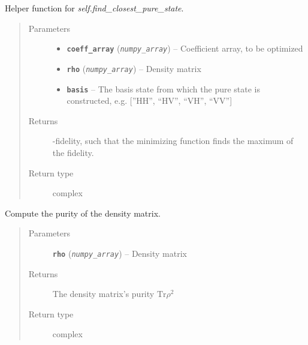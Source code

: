 \documentclass[letterpaper,10pt,english]{sphinxmanual}
\begin{document}
\begin{fulllineitems}
\begin{fulllineitems}
\label{modules:Tomography.DensityMatrix.opt_pure_state}
Helper function for \emph{self.find\_closest\_pure\_state}.
\begin{quote}\begin{description}
\item[{Parameters}] \leavevmode\begin{itemize}
\item {} 
\textbf{\texttt{coeff\_array}} (\emph{\texttt{numpy\_array}}) -- Coefficient array, to be optimized

\item {} 
\textbf{\texttt{rho}} (\emph{\texttt{numpy\_array}}) -- Density matrix

\item {} 
\textbf{\texttt{basis}} -- The basis state from which the pure state is constructed, e.g. {[}''HH'', ``HV'', ``VH'', ``VV''{]}

\end{itemize}

\item[{Returns}] -fidelity, such that the minimizing function finds the maximum of the fidelity.

\item[{Return type}] \leavevmode
complex

\end{description}\end{quote}

\end{fulllineitems}


\begin{fulllineitems}
\label{modules:Tomography.DensityMatrix.purity}
Compute the purity of the density matrix.
\begin{quote}\begin{description}
\item[{Parameters}] \leavevmode
\textbf{\texttt{rho}} (\emph{\texttt{numpy\_array}}) -- Density matrix

\item[{Returns}] \leavevmode
The density matrix's purity \(\mathrm{Tr}\rho^2\)

\item[{Return type}] \leavevmode
complex


\end{description}
\end{quote}
\end{fulllineitems}
\end{fulllineitems}
\end{document}
